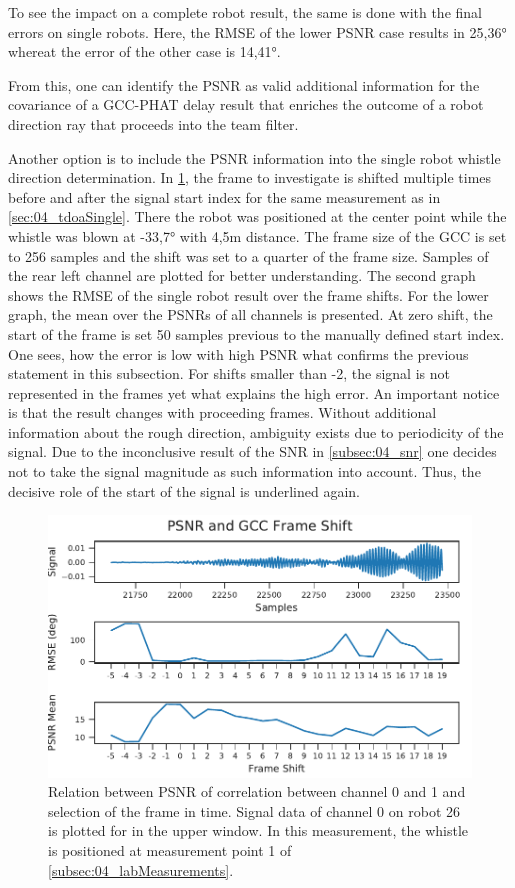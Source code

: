 To see the impact on a complete robot result, the same is done
with the final errors on single robots.
Here, the \ac{RMSE} of the lower \ac{PSNR} case results in 25,36\si{\degree}
whereat the error of the other case is 14,41\si{\degree}.

From this, one can identify the \ac{PSNR} as valid additional information
for the covariance of a \ac{GCC-PHAT} delay result that enriches the
outcome of a robot direction ray that proceeds into the team filter.

Another option is to include the PSNR information into the single
robot whistle direction determination.
In \cref{fig:04_psnr2FrameShift}, the frame to investigate is
shifted multiple times before and after the signal start index
for the same measurement as in \cref{sec:04_tdoaSingle}.
There the robot was positioned at the center point
while the whistle was blown at -33,7\si{\degree} with 4,5\si{\meter}
distance.
The frame size of the \ac{GCC} is set to 256 samples and the shift
was set to a quarter of the frame size.
Samples of the rear left channel are plotted for better understanding.
The second graph shows the \ac{RMSE} of the single robot result
over the frame shifts.
For the lower graph, the mean over the \acp{PSNR} of all channels
is presented.
At zero shift, the start of the frame is set 50 samples previous to the
manually defined start index.
One sees, how the error is low with high \ac{PSNR} what confirms
the previous statement in this subsection.
For shifts smaller than -2, the signal is not represented in the
frames yet what explains the high error.
An important notice is that the result changes with proceeding
frames.
Without additional information about the rough direction,
ambiguity exists due to periodicity of the signal.
Due to the inconclusive result of the \ac{SNR} in \cref{subsec:04_snr}
one decides not to take the signal magnitude as such information
into account.
Thus, the decisive role of the start of the signal is underlined again.
\begin{figure}[ht]
	\centering
	\includegraphics[]{figures/evaluation/gcc_frame_shift}
	\caption{
		Relation between \ac{PSNR} of correlation between channel 0 and 1
		and selection of the frame in time. Signal data
		of channel 0 on robot 26 is plotted for in the upper window.
		In this measurement, the whistle is positioned at measurement point 1
		of \cref{subsec:04_labMeasurements}.
	}
	\label{fig:04_psnr2FrameShift}
\end{figure}


